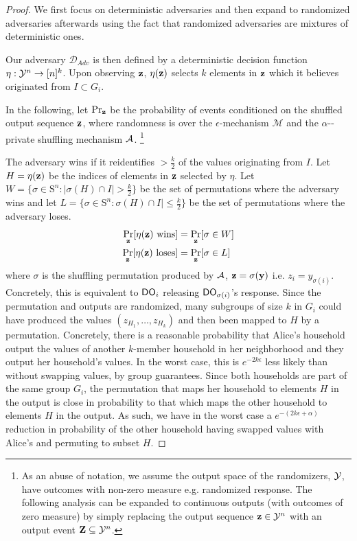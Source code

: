  \begin{proof}
 
  We first focus on deterministic adversaries and then expand to randomized adversaries afterwards using the fact that randomized adversaries are mixtures of deterministic ones. 

Our adversary $\mathcal{D}_{Adv}$ is then defined by a deterministic decision function $\eta: \mathcal{Y}^n \rightarrow [n]^k$. Upon observing $\mathbf{z}$, $\eta(\mathbf{z})$ selects $k$ elements in $\mathbf{z}$ which it believes originated from $I \subset G_i$. 
 
 In the following, let $\Pr_{\mathbf{z}}$ be the probability of events conditioned on the shuffled output sequence $\mathbf{z}$, where randomness is over the $\epsilon$-\ldp mechanism $\mathcal{M}$ and the $\alpha$-\name-private shuffling mechanism $\mathcal{A}$. \footnote{As an abuse of notation, we assume the output space of the \ldp randomizers, $\mathcal{Y}$, have outcomes with non-zero measure e.g. randomized response. The following analysis can be expanded to continuous outputs (with outcomes of zero measure) by simply replacing the output sequence $\mathbf{z} \in \mathcal{Y}^n$ with an output event $\mathbf{Z} \subseteq \mathcal{Y}^n$.}
 
 The adversary wins if it reidentifies $> \frac{k}{2}$ of the \ldp values originating from $I$. Let $H = \eta(\mathbf{z})$ be the indices of elements in $\mathbf{z}$ selected by $\eta$. Let $W = \{\sigma \in \mathrm{S}^n : |\sigma(H) \cap I| > \frac{k}{2}\}$ be the set of permutations where the adversary wins and let $L = \{\sigma \in \mathrm{S}^n :\sigma(H) \cap I| \leq \frac{k}{2}\} $ be the set of permutations where the adversary loses. 
 \begin{align*}
     \Pr_{\mathbf{z}} [\eta(\mathbf{z}) \text{ wins}] &= \Pr_{\mathbf{z}} [\sigma \in W] \\
     \Pr_{\mathbf{z}} [\eta(\mathbf{z}) \text{ loses}] &= \Pr_{\mathbf{z}} [\sigma \in L] 
 \end{align*}
 where $\sigma$ is the shuffling permutation produced by $\mathcal{A}$, $\mathbf{z} = \sigma(\mathbf{y})$ i.e. $z_i = y_{\sigma(i)}$. Concretely, this is equivalent to $\textsf{DO}_i$ releasing $\textsf{DO}_{\sigma(i)}$'s \ldp response. Since the permutation and \ldp outputs are randomized, many subgroups of size $k$ in $G_i$ could have produced the \ldp values $(z_{H_1}, \dots, z_{H_k})$ and then been mapped to $H$ by a permutation. Concretely, there is a reasonable probability that Alice's household output the \ldp values of another $k$-member household in her neighborhood and they output her household's \ldp values. In the worst case, this is $e^{-2k \epsilon}$ less likely than without swapping values, by group \DP guarantees. Since both households are part of the same group $G_i$, the permutation that maps her household to elements $H$ in the output is close in probability to that which maps the other household to elements $H$ in the output. As such, we have in the worst case a $e^{-(2k\epsilon + \alpha)}$ reduction in probability of the other household having swapped \ldp values with Alice's and permuting to subset $H$. 
 

\end{proof}
